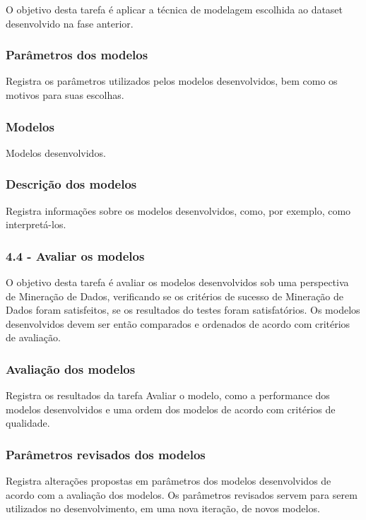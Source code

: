 O objetivo desta tarefa é aplicar a técnica de modelagem escolhida ao dataset desenvolvido na fase anterior.

\subsubsection*{Parâmetros dos modelos}

Registra os parâmetros utilizados pelos modelos desenvolvidos, bem como os motivos para suas escolhas.

\subsubsection*{Modelos}

Modelos desenvolvidos.

\subsubsection*{Descrição dos modelos}

Registra informações sobre os modelos desenvolvidos, como, por exemplo, como interpretá-los.

\subsubsection*{\textbf{4.4 - Avaliar os modelos}}

O objetivo desta tarefa é avaliar os modelos desenvolvidos sob uma perspectiva de Mineração de Dados, verificando se os critérios de sucesso de Mineração de Dados foram satisfeitos, se os resultados do testes foram satisfatórios. Os modelos desenvolvidos devem ser então comparados e ordenados de acordo com critérios de avaliação.

\subsubsection*{Avaliação dos modelos}

Registra os resultados da tarefa Avaliar o modelo, como a performance dos modelos desenvolvidos e uma ordem dos modelos de acordo com critérios de qualidade.

\subsubsection*{Parâmetros revisados dos modelos}

Registra alterações propostas em parâmetros dos modelos desenvolvidos de acordo com a avaliação dos modelos. Os parâmetros revisados servem para serem utilizados no desenvolvimento, em uma nova iteração, de novos modelos.

